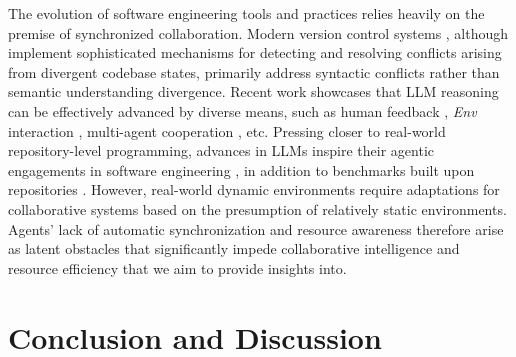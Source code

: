 The evolution of software engineering tools and practices relies heavily on the premise of synchronized collaboration. Modern version control systems \cite{version_control_git, version_control_PredictingMC, version_control_NanoVC}, although implement sophisticated mechanisms for detecting and resolving conflicts arising from divergent codebase states, primarily address syntactic conflicts rather than semantic understanding divergence. 
Recent work showcases that LLM reasoning can be effectively advanced by diverse means, such as human feedback \cite{human-sim-mint, image_retrieval}, \textit{Env} interaction \cite{OpenHands, CodeAct, CodeAgent}, multi-agent cooperation \cite{AgentCoder}, etc.
Pressing closer to real-world repository-level programming, advances in LLMs inspire their agentic engagements in software engineering \cite{LLM_in_software_engineering}, in addition to benchmarks built upon \github repositories \cite{SWE-bench, R2E, benchmark_CoReQA}.
However, real-world dynamic environments require adaptations for collaborative systems based on the presumption of relatively static environments. Agents' lack of automatic synchronization and resource awareness therefore arise as latent obstacles that significantly impede collaborative intelligence and resource efficiency that we aim to provide insights into.







\section{Conclusion and Discussion}
\label{Section: Conclusion and Discussion}

